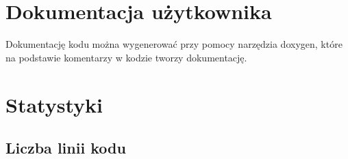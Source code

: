 \documentclass[a4paper,titlepage,11pt,twosides,floatssmall]{mwrep}
\begin{document}
\maketitle

\tableofcontents
\chapter{Dokumentacja użytkownika}

Dokumentację kodu można wygenerować przy pomocy narzędzia doxygen, które na podstawie komentarzy
w kodzie tworzy dokumentację.



\chapter{Statystyki}
\section{Liczba linii kodu}

\end{document}

